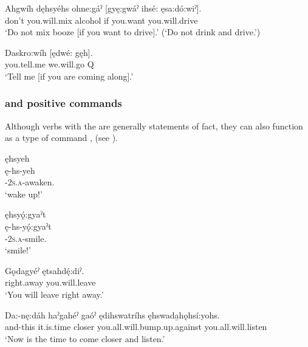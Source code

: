 \ea\label{ex:futureex24} 
\ea\label{ex:futureex24a}
\gll Ahgwíh dęhsyéhs ohne:gáˀ [gyę:gwáˀ ihsé: ęsa:dó:wiˀ]. \\
don’t you.will.mix alcohol if you.want you.will.drive \\
\glt ‘Do not mix booze [if you want to drive].’ (‘Do not drink and drive.’)

\ex\label{ex:futureex24b}
\gll Daskro:wíh [ędwé: gęh].\\
you.tell.me we.will.go Q\\
\glt ‘Tell me [if you are coming along].’
\z
\z



\subsubsection*{ {\future} and positive commands} \label{[ę-] future and positive commands}
Although verbs with the  {\future} are generally statements of fact, they can also function as a type of command , (see ). 

\ea\label{ex:futureex5}

\ea ęhsyeh\\
\gll ę-hs-yeh\\
\fut-\textsc{2s.a}-awaken.{\zeropunctual}\\
\glt `wake up!'

\ex ęhsyǫ́:gyaˀt\\
\gll ę-hs-yǫ́:gyaˀt\\
\fut-\textsc{2s.a}-smile.{\zeropunctual}\\
\glt `smile!'

\ex
\gll Gǫdagyéˀ ętsahdę́:diˀ. \\
right.away you.will.leave\\
\glt ‘You will leave right away.’ 

\ex
\gll Da:-nę:dáh haˀgahéˀ gaóˀ ędihswatríhs ęhswada̱hǫhsí:yohs.  \\
and-this it.is.time closer you.all.will.bump.up.against you.all.will.listen \\
\glt ‘Now is the time to come closer and listen.’

